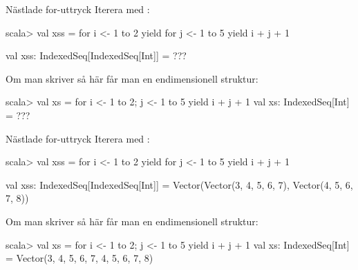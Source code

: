 







\begin{Slide}{Nästlade for-uttryck}\SlideFontSmall
Iterera med :\\

\begin{REPL}
scala> val xss = for i <- 1 to 2 yield 
                   for j <- 1 to 5 yield i + j + 1
                 
val xss: IndexedSeq[IndexedSeq[Int]] =
      ???

\end{REPL}
\pause Om man skriver så här får man en endimensionell struktur:
\begin{REPL}
scala> val xs = for { i <- 1 to 2; j <- 1 to 5 } yield i + j + 1
val xs: IndexedSeq[Int] =
    ???

\end{REPL}
\end{Slide}

\begin{Slide}{Nästlade for-uttryck}\SlideFontSmall
Iterera med :\\
\begin{REPL}
scala> val xss = for i <- 1 to 2 yield 
                   for j <- 1 to 5 yield i + j + 1

val xss: IndexedSeq[IndexedSeq[Int]] =
    Vector(Vector(3, 4, 5, 6, 7), Vector(4, 5, 6, 7, 8))

\end{REPL}
\pause Om man skriver så här får man en endimensionell struktur:
\begin{REPL}
scala> val xs = for { i <- 1 to 2; j <- 1 to 5 } yield i + j + 1
val xs: IndexedSeq[Int] =
    Vector(3, 4, 5, 6, 7, 4, 5, 6, 7, 8)

\end{REPL}
\end{Slide}



